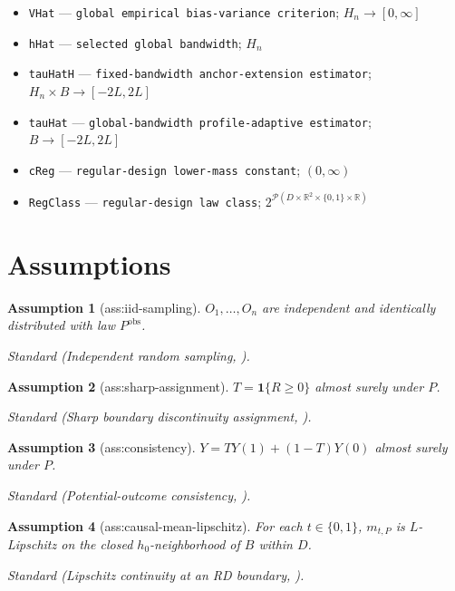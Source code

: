 \documentclass{article}
\newtheorem{assumption}{Assumption}
\begin{document}
\begin{itemize}
  \item \texttt{VHat} --- \texttt{global empirical bias-\allowbreak{}variance criterion}; \(H_n\to[0,\infty]\)
  \item \texttt{hHat} --- \texttt{selected global bandwidth}; \(H_n\)
  \item \texttt{tauHatH} --- \texttt{fixed-\allowbreak{}bandwidth anchor-\allowbreak{}extension estimator}; \(H_n\times B\to[-2L,2L]\)
  \item \texttt{tauHat} --- \texttt{global-\allowbreak{}bandwidth profile-\allowbreak{}adaptive estimator}; \(B\to[-2L,2L]\)
  \item \texttt{cReg} --- \texttt{regular-\allowbreak{}design lower-\allowbreak{}mass constant}; \((0,\infty)\)
  \item \texttt{RegClass} --- \texttt{regular-\allowbreak{}design law class}; \(2^{\mathcal P(D\times\mathbb R^2\times\{0,1\}\times\mathbb R)}\)
\end{itemize}

\section{Assumptions}

\begin{assumption}[ass:iid-sampling]\label{ass:iid-sampling}
\(O_1,\ldots,O_n\) are independent and identically distributed with law \(P^{\mathrm{obs}}\).
\par\smallskip\noindent\emph{Standard} (Independent random sampling, \cite{CattaneoTitiunikYu2025BoundaryRD}).
\end{assumption}

\begin{assumption}[ass:sharp-assignment]\label{ass:sharp-assignment}
\(T=\mathbf1\{R\geq0\}\) almost surely under \(P\).
\par\smallskip\noindent\emph{Standard} (Sharp boundary discontinuity assignment, \cite{HahnToddVanderKlaauw2001RD}).
\end{assumption}

\begin{assumption}[ass:consistency]\label{ass:consistency}
\(Y=TY(1)+(1-T)Y(0)\) almost surely under \(P\).
\par\smallskip\noindent\emph{Standard} (Potential-outcome consistency, \cite{HahnToddVanderKlaauw2001RD}).
\end{assumption}

\begin{assumption}[ass:causal-mean-lipschitz]\label{ass:causal-mean-lipschitz}
For each \(t\in\{0,1\}\), \(m_{t,P}\) is \(L\)-Lipschitz on the closed \(h_0\)-neighborhood of \(B\) within \(D\).
\par\smallskip\noindent\emph{Standard} (Lipschitz continuity at an RD boundary, \cite{HahnToddVanderKlaauw2001RD}).
\end{assumption}
\end{document}
